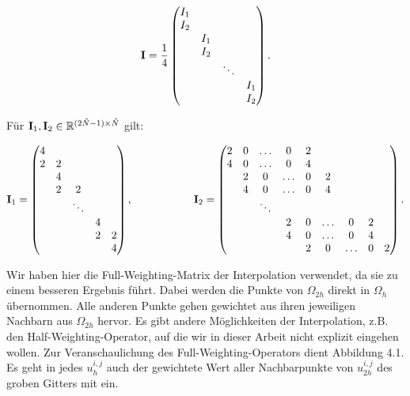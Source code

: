 \begin{equation}
{\textbf{I}} = \frac {1} {4}
\begin{pmatrix}
I_{1} & & &\\
I_{2} & & &\\
& I_{1} & &\\
& I_{2} & &\\
& & \ddots &\\
& & & I_{1}\\
& & & I_{2}
\end{pmatrix}.
\end{equation}

Für ${\textbf{I}}_{1},{\textbf{I}}_{2} \in \mathbb{R}^{(2\tilde N - 1) \times \tilde N}$ gilt:

\begin{equation}
{\textbf{I}}_{1} =
\begin{pmatrix}
4 & & & &\\
2 & 2 & & &\\
& 4 & & &\\
& 2 & 2 & &\\
& & \ddots & &\\
& & & 4 &\\
& & & 2 & 2\\
& & & & 4\\
\end{pmatrix},
\hspace{2cm}
{\textbf{I}}_{2} =
\begin{pmatrix}
2 & 0 & \hdots & 0 & 2 & & & &\\
4 & 0 & \hdots & 0 & 4 & & & &\\
& 2 & 0 & \hdots & 0 & 2 & & &\\
& 4 & 0 & \hdots & 0 & 4 & & &\\
& & \ddots & & & &\\
& & & 2 & 0 & \hdots & 0 & 2 &\\
& & & 4 & 0 & \hdots & 0 & 4 &\\
& & & & 2 & 0 & \hdots & 0 & 2\\
\end{pmatrix}.
\end{equation}

Wir haben hier die Full-Weighting-Matrix der Interpolation verwendet, da sie zu einem besseren Ergebnis führt. Dabei werden die Punkte von $\Omega_{2h}$ direkt in $\Omega_{h}$ übernommen. Alle anderen Punkte gehen gewichtet aus ihren jeweiligen Nachbarn aus $\Omega_{2h}$ hervor. Es gibt andere Möglichkeiten der Interpolation, z.B. den Half-Weighting-Operator, auf die wir in dieser Arbeit nicht explizit eingehen wollen. Zur Veranschaulichung des Full-Weighting-Operators dient Abbildung 4.1. Es geht in jedes $u^{i,j}_{h}$ auch der gewichtete Wert aller Nachbarpunkte von $u^{i,j}_{2h}$ des groben Gitters mit ein.

